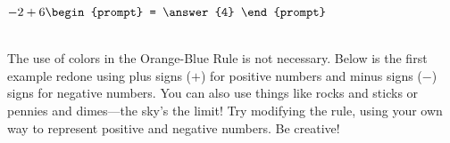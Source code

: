 \documentclass{ximera}[font=12pt]
\begin{document}
\begin{problem}

$-2 + 6 \begin{prompt} =  \answer{4} \end{prompt}$

\end{problem}


~ \\[12pt]  %
The use of colors in the Orange-Blue Rule is not necessary. Below is the first example redone using plus signs ($+$) for 
positive numbers and minus signs ($-$) signs for negative numbers.  You can also use things like rocks and sticks or
pennies and dimes---the sky's the limit!  Try modifying the rule, using your own way to represent positive and negative 
numbers.  Be creative!





\end{document}
